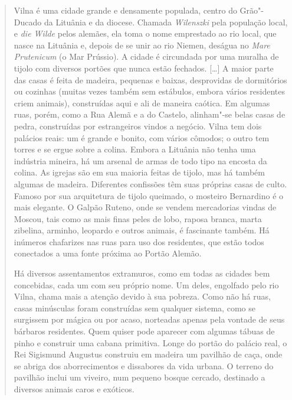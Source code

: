 \begin{quote}
Vilna é uma cidade grande e densamente populada, centro do Grão"-Ducado
da Lituânia e da diocese. Chamada \textit{Wilenszki} pela população local,
e \textit{die Wilde} pelos alemães, ela toma o nome emprestado ao rio
local, que nasce na Lituânia e, depois de se unir ao rio Niemen, deságua
no \textit{Mare Prutenicum} (o Mar Prússio). A cidade é circundada por uma
muralha de tijolo com diversos portões que nunca estão fechados.
[\ldots{}] A maior parte das casas é feita de madeira, pequenas e baixas,
desprovidas de dormitórios ou cozinhas (muitas vezes também sem
estábulos, embora vários residentes criem animais), construídas aqui e
ali de maneira caótica. Em algumas ruas, porém, como a Rua Alemã e a do
Castelo, alinham"-se belas casas de pedra, construídas por estrangeiros
vindos a negócio. Vilna tem dois palácios reais: um é grande e bonito,
com vários cômodos; o outro tem torres e se ergue sobre a colina. Embora
a Lituânia não tenha uma indústria mineira, há um arsenal de armas de
todo tipo na encosta da colina. As igrejas são em sua maioria feitas de
tijolo, mas há também algumas de madeira. Diferentes confissões têm suas
próprias casas de culto. Famoso por sua arquitetura de tijolo queimado,
o mosteiro Bernardino é o mais elegante. O Galpão Ruteno, onde se vendem
mercadorias vindas de Moscou, tais como as mais finas peles de lobo,
raposa branca, marta zibelina, arminho, leopardo e outros animais, é
fascinante também. Há inúmeros chafarizes nas ruas para uso dos
residentes, que estão todos conectados a uma fonte próxima ao Portão
Alemão.

Há diversos assentamentos extramuros, como em todas as cidades bem
concebidas, cada um com seu próprio nome. Um deles, engolfado pelo rio
Vilna, chama mais a atenção devido à sua pobreza. Como não há ruas,
casas minúsculas foram construídas sem qualquer sistema, como se
surgissem por mágica ou por acaso, norteadas apenas pela vontade de seus
bárbaros residentes. Quem quiser pode aparecer com algumas tábuas de
pinho e construir uma cabana primitiva. Longe do portão do palácio real,
o Rei Sigismund Augustus construiu em madeira um pavilhão de caça, onde
se abriga dos aborrecimentos e dissabores da vida urbana. O terreno do
pavilhão inclui um viveiro, num pequeno bosque cercado, destinado a
diversos animais caros e exóticos.

%


\end{quote}
